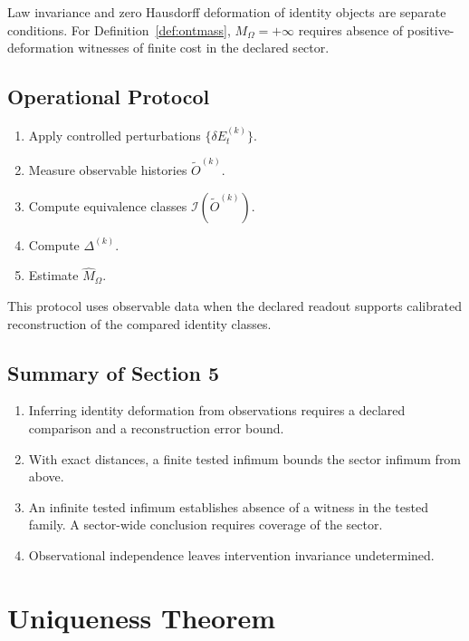 \documentclass[11pt,a4paper]{article}
\theoremstyle{plain}
\theoremstyle{definition}
\theoremstyle{remark}
\begin{document}
Law invariance and zero Hausdorff deformation of identity objects are separate conditions. For Definition~\ref{def:ontmass}, $M_\Omega=+\infty$ requires absence of positive-deformation witnesses of finite cost in the declared sector.

\subsection{Operational Protocol}

\begin{enumerate}[leftmargin=*]
    \item Apply controlled perturbations $\{\delta E_t^{(k)}\}$.
    \item Measure observable histories $\tilde{O}^{(k)}$.
    \item Compute equivalence classes $\mathcal{I}(\tilde{O}^{(k)})$.
    \item Compute $\Delta^{(k)}$.
    \item Estimate $\hat{M}_\Omega$.
\end{enumerate}

This protocol uses observable data when the declared readout supports calibrated reconstruction of the compared identity classes.

\subsection{Summary of Section 5}

\begin{enumerate}[leftmargin=*]
    \item Inferring identity deformation from observations requires a declared comparison and a reconstruction error bound.
    \item With exact distances, a finite tested infimum bounds the sector infimum from above.
    \item An infinite tested infimum establishes absence of a witness in the tested family. A sector-wide conclusion requires coverage of the sector.
    \item Observational independence leaves intervention invariance undetermined.
\end{enumerate}

\section{Uniqueness Theorem}
\end{document}
